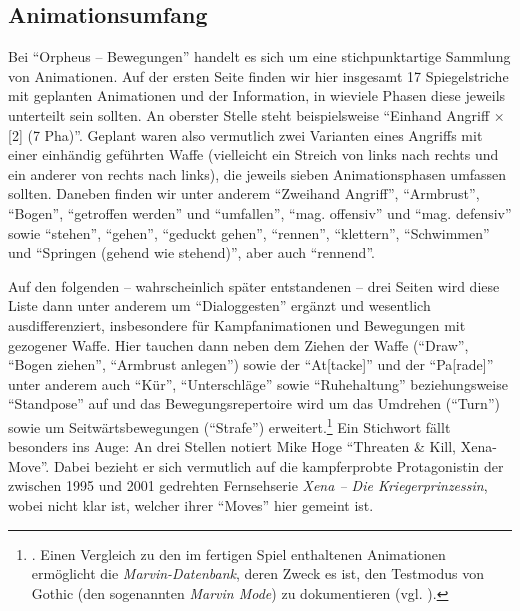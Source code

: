 \documentclass[a5paper,pagesize]{scrbook}
\begin{document}
\subsection{Animationsumfang}\label{sec:orpheus_technik_animationsumfang}
Bei \enquote{Orpheus -- Bewegungen} handelt es sich um eine stichpunktartige Sammlung von Animationen.
Auf der ersten Seite finden wir hier insgesamt 17 Spiegelstriche mit geplanten Animationen und der Information, in wieviele Phasen diese jeweils unterteilt sein sollten.
An oberster Stelle steht beispielsweise \enquote{Einhand Angriff × [2] (7 Pha)}.\autocite[S.~1]{orpheus_bewegungen}
Geplant waren also vermutlich zwei Varianten eines Angriffs mit einer einhändig geführten Waffe (vielleicht ein Streich von links nach rechts und ein anderer von rechts nach links), die jeweils sieben Animationsphasen umfassen sollten.
Daneben finden wir unter anderem \enquote{Zweihand Angriff}, \enquote{Armbrust}, \enquote{Bogen}, \enquote{getroffen werden} und \enquote{umfallen}, \enquote{mag. offensiv} und \enquote{mag. defensiv} sowie \enquote{stehen}, \enquote{gehen}, \enquote{geduckt gehen}, \enquote{rennen}, \enquote{klettern}, \enquote{Schwimmen} und \enquote{Springen (gehend wie stehend)}, aber auch \enquote{rennend}.\autocite[S.~1]{orpheus_bewegungen}

Auf den folgenden -- wahrscheinlich später entstandenen -- drei Seiten wird diese Liste dann unter anderem um \enquote{Dialoggesten}\autocite[S.~4]{orpheus_bewegungen} ergänzt und wesentlich ausdifferenziert, insbesondere für Kampfanimationen und Bewegungen mit gezogener Waffe.
Hier tauchen dann neben dem Ziehen der Waffe (\enquote{Draw}, \enquote{Bogen ziehen}, \enquote{Armbrust anlegen}) sowie der \enquote{At[tacke]} und der \enquote{Pa[rade]} unter anderem auch \enquote{Kür}, \enquote{Unterschläge} sowie \enquote{Ruhehaltung} beziehungsweise \enquote{Standpose} auf und das Bewegungsrepertoire wird um das Umdrehen (\enquote{Turn}) sowie um Seitwärtsbewegungen (\enquote{Strafe}) erweitert.\footnote{\autocite[S.~2--4]{orpheus_bewegungen}. Einen Vergleich zu den im fertigen Spiel enthaltenen Animationen ermöglicht die \textit{Marvin-Datenbank}, deren Zweck es ist, den Testmodus von Gothic (den sogenannten \textit{Marvin Mode}) zu dokumentieren (vgl. \autocite{sillus_marvin}).}
Ein Stichwort fällt besonders ins Auge:
An drei Stellen notiert Mike Hoge \enquote{Threaten \& Kill, Xena-Move}.\autocite[S.~2]{orpheus_bewegungen}
Dabei bezieht er sich vermutlich auf die kampferprobte Protagonistin der zwischen 1995 und 2001 gedrehten Fernsehserie \textit{Xena -- Die Kriegerprinzessin}, wobei nicht klar ist, welcher ihrer \enquote{Moves} hier gemeint ist. %
\end{document}
